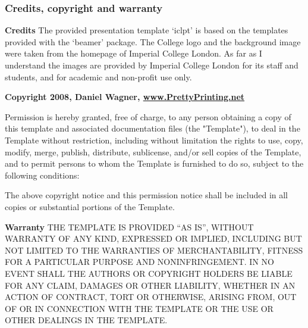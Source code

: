 \documentclass[t]{beamer}
\begin{document}
\begin{frame}
\frametitle{Credits, copyright and warranty}

\tiny

\textbf{Credits}
The provided presentation template `iclpt' is based on the 
templates provided with the `beamer' package. The College 
logo and the background image were taken from the homepage 
of Imperial College London. As far as I understand the images 
are provided by Imperial College London for its staff and students, 
and for academic and non-profit use only.
\medskip

\textbf{Copyright 2008, Daniel Wagner, \url{www.PrettyPrinting.net}}

Permission is hereby granted, free of charge, to any person
obtaining a copy of this template and associated
documentation files (the "Template"), to deal in the Template
without restriction, including without limitation the rights to
use, copy, modify, merge, publish, distribute, sublicense,
and/or sell copies of the Template, and to permit persons to
whom the Template is furnished to do so, subject to the
following conditions:\medskip

The above copyright notice and this permission notice shall be
included in all copies or substantial portions of the Template.

\textbf{Warranty}
\uppercase{The Template is provided ``As Is'', without warranty of any
kind, expressed or implied, including but not limited to the
warranties of merchantability, fitness for a particular purpose and
noninfringement. In no event shall the authors or copyright holders be
liable for any claim, damages or other liability, whether in an action
of contract, tort or otherwise, arising from, out of or in connection
with the template or the use or other dealings in the template.}
\end{frame} 
\end{document}
